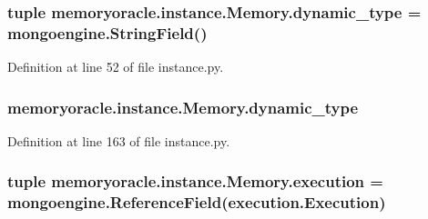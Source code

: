 \hypertarget{classmemoryoracle_1_1instance_1_1Memory_a0e65734b42b7fbb648f644e3d40b039d}{}
\subsubsection[{dynamic\+\_\+type}]{\setlength{\rightskip}{0pt plus 5cm}tuple memoryoracle.\+instance.\+Memory.\+dynamic\+\_\+type = mongoengine.\+String\+Field()\hspace{0.3cm}{\ttfamily [static]}}\label{classmemoryoracle_1_1instance_1_1Memory_a0e65734b42b7fbb648f644e3d40b039d}


Definition at line 52 of file instance.\+py.

\hypertarget{classmemoryoracle_1_1instance_1_1Memory_a99da30d4d3ea15d582a12b273ac7bee1}{}
\subsubsection[{dynamic\+\_\+type}]{\setlength{\rightskip}{0pt plus 5cm}memoryoracle.\+instance.\+Memory.\+dynamic\+\_\+type}\label{classmemoryoracle_1_1instance_1_1Memory_a99da30d4d3ea15d582a12b273ac7bee1}


Definition at line 163 of file instance.\+py.

\hypertarget{classmemoryoracle_1_1instance_1_1Memory_ad5fcccd559af49bd7a0ed2b25a08ec87}{}
\subsubsection[{execution}]{\setlength{\rightskip}{0pt plus 5cm}tuple memoryoracle.\+instance.\+Memory.\+execution = mongoengine.\+Reference\+Field({\bf execution.\+Execution})\hspace{0.3cm}{\ttfamily [static]}}\label{classmemoryoracle_1_1instance_1_1Memory_ad5fcccd559af49bd7a0ed2b25a08ec87}


